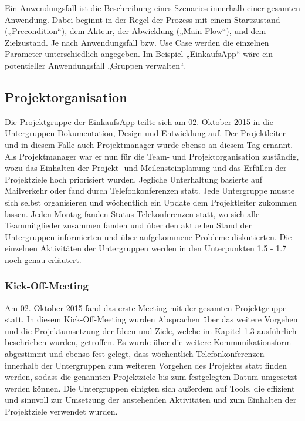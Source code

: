 \documentclass[12pt,a4paper]{article}
\begin{document}
Ein Anwendungsfall ist die Beschreibung eines Szenarios innerhalb einer gesamten Anwendung. Dabei beginnt in der Regel der Prozess mit einem Startzustand („Precondition“), dem Akteur, der Abwicklung („Main Flow“), und dem Zielzustand. Je nach Anwendungsfall bzw. Use Case werden die einzelnen Parameter unterschiedlich angegeben. 
Im Beispiel „EinkaufsApp“ wäre ein potentieller Anwendungsfall „Gruppen verwalten“. 


\newpage
\subsection{Projektorganisation}
Die Projektgruppe der EinkaufsApp teilte sich am 02. Oktober 2015 in die Untergruppen Dokumentation, Design und Entwicklung auf.
Der Projektleiter und in diesem Falle auch Projektmanager wurde ebenso an diesem Tag ernannt.
Als Projektmanager war er nun für die Team- und Projektorganisation zuständig, wozu das Einhalten der Projekt- und Meilensteinplanung  und das Erfüllen der Projektziele hoch priorisiert wurden.
Jegliche Unterhaltung basierte auf Mailverkehr oder fand durch Telefonkonferenzen statt. Jede Untergruppe musste sich selbst organisieren und wöchentlich ein Update dem Projektleiter zukommen lassen. Jeden Montag fanden Status-Telekonferenzen statt, wo sich alle Teammitglieder zusammen fanden und über den aktuellen Stand der Untergruppen informierten und über aufgekommene Probleme diskutierten. Die einzelnen Aktivitäten der Untergruppen werden in den Unterpunkten  1.5 - 1.7 noch genau erläutert.


\subsubsection{Kick-Off-Meeting}
Am 02. Oktober  2015 fand das erste Meeting mit der gesamten Projektgruppe statt. In diesem Kick-Off-Meeting wurden Absprachen über das weitere Vorgehen und die Projektumsetzung der Ideen und Ziele, welche im Kapitel 1.3 ausführlich beschrieben wurden, getroffen. Es wurde über die weitere Kommunikationsform abgestimmt und ebenso fest gelegt, dass wöchentlich Telefonkonferenzen innerhalb der Untergruppen zum weiteren Vorgehen des Projektes statt finden werden, sodass die genannten Projektziele bis zum festgelegten Datum umgesetzt werden können. 
Die Untergruppen einigten sich außerdem auf Tools, die effizient und sinnvoll zur Umsetzung der anstehenden Aktivitäten und zum Einhalten der Projektziele verwendet wurden. 
\newpage
\end{document}
